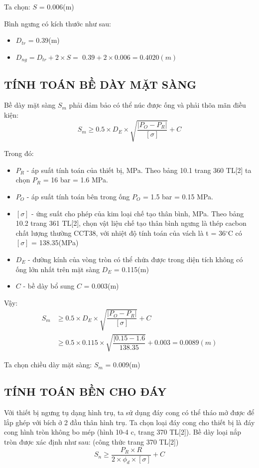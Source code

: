 Ta chọn: $S$ = 0.006(m)

Bình ngưng có kích thước như sau:
\begin{itemize}[label={$\diamond$}]
	\item $D_{tr}$ = 0.39(m)
	\item $D_{ng} = D_{tr} + 2\times S =$ $0.39 + 2 \times 0.006 = 0.4020(m)$
	      
\end{itemize}

\subsection{TÍNH TOÁN BỀ DÀY MẶT SÀNG}
Bề dày mặt sàng $S_{m}$ phải đảm bảo có thể núc được ống và phải thõa mãn điều kiện:
\begin{equation*}
	S_{m} \geq 0.5\times D_{E}\times \sqrt{\dfrac{|P_{O} - P_{R}|}{[\sigma]}} + C
\end{equation*}

Trong đó:
\begin{itemize}
	\item $P_{R}$ - áp suất tính toán của thiết bị, MPa. Theo bảng 10.1 trang 360 TL[2] ta chọn $P_{R}$ = 16 bar = 1.6  MPa.
	\item $P_{O}$ - áp suất tính toán bên trong ống $P_{O}$ = 1.5 bar = 0.15 MPa.
	\item $[\sigma]$ - ứng suất cho phép của kim loại chế tạo thân bình, MPa. Theo bảng 10.2 trang 361 TL[2], chọn vật liệu chế tạo thân bình ngưng là thép cacbon chất lượng thường CCT38, với nhiệt độ tính toán của vách là t = 36$^{\circ}$C có $[\sigma]$ = 138.35(MPa)	
	\item $D_{E}$ - đường kính của vòng tròn có thể chứa được trong diện tích không có ống lớn nhất trên mặt sàng $D_{E}$ = 0.115(m)
	\item $C$ - bề dày bổ sung $C$ = 0.003(m)
\end{itemize}

Vậy:
\begin{equation*}
\begin{split}
		S_{m} &\geq 0.5\times D_{E}\times \sqrt{\dfrac{|P_{O} - P_{R}|}{[\sigma]}} + C\\
		&\geq 0.5 \times 0.115 \times \sqrt{\dfrac{|0.15-1.6}{138.35}} + 0.003 = 0.0089(m)
\end{split}
\end{equation*}

Ta chọn chiều dày mặt sàng: $S_{m}$ = 0.009(m)

\subsection{TÍNH TOÁN BỀN CHO ĐÁY}
Với thiết bị ngưng tụ dạng hình trụ, ta sử dụng đáy cong có thể tháo mở được để lắp ghép với bích ở 2 đầu thân hình trụ. Ta chọn loại đáy cong cho thiết bị là đáy cong hình tròn không bo mép (hình 10-4 c, trang 370 TL[2]).
Bề dày loại nắp tròn được xác định như sau: (công thức trang 370 TL[2])
\begin{equation*}
	S_{n} \geq \dfrac{P_{R}\times R}{2\times \phi_{d}\times[\sigma]} + C
\end{equation*}

